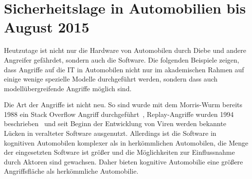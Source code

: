 \section{Sicherheitslage in Automobilien bis August 2015}\label{sec:sicherheitslage}
Heutzutage ist nicht nur die Hardware von Automobilen durch Diebe und andere
Angreifer gefährdet, sondern auch die Software. Die folgenden Beispiele zeigen,
dass Angriffe auf die IT in Automobilen nicht nur im akademischen Rahmen
auf einige wenige spezielle Modelle durchgeführt werden, sondern dass auch
modellübergreifende Angriffe möglich sind.

Die Art der Angriffe ist nicht neu. So sind wurde mit dem Morris-Wurm bereits
1988 ein Stack Overflow Angriff durchgeführt~\cite{Seltzer2013},
Replay-Angriffe wurden 1994 beschrieben~\cite{Syverson1994} und seit Beginn
der Entwicklung von Viren werden bekannte Lücken in veralteter Software
ausgenutzt. Allerdings ist die Software in kognitiven Automobilen komplexer
als in herkömmlichen Automobilen, die Menge der eingesetzten Software ist
größer und die Möglichkeiten zur Einflussnahme durch Aktoren sind gewachsen.
Daher bieten kognitive Automobilie eine größere Angriffsfläche als
herkömmliche Automobilie.

